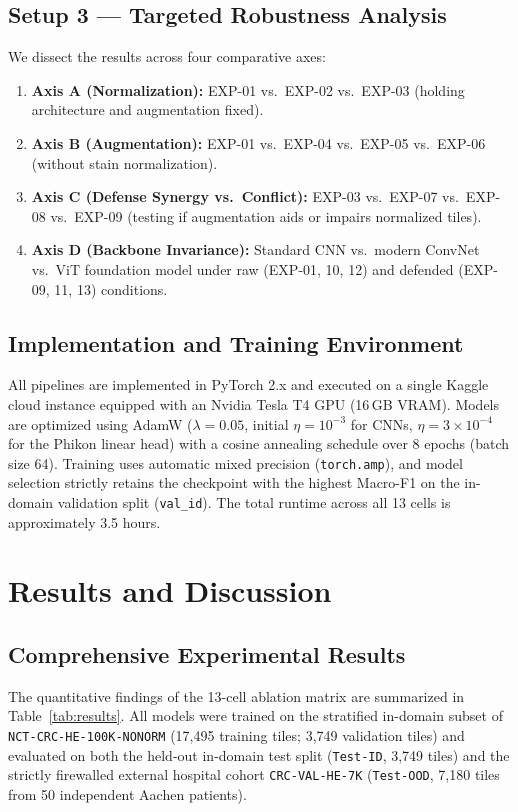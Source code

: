 \documentclass[11pt,a4paper]{article}
\begin{document}
\subsection{Setup 3 --- Targeted Robustness Analysis}
We dissect the results across four comparative axes:
\begin{enumerate}[leftmargin=*,itemsep=1pt]
  \item \textbf{Axis A (Normalization):} EXP-01 vs.\ EXP-02 vs.\ EXP-03 (holding architecture and augmentation fixed).
  \item \textbf{Axis B (Augmentation):} EXP-01 vs.\ EXP-04 vs.\ EXP-05 vs.\ EXP-06 (without stain normalization).
  \item \textbf{Axis C (Defense Synergy vs.\ Conflict):} EXP-03 vs.\ EXP-07 vs.\ EXP-08 vs.\ EXP-09 (testing if augmentation aids or impairs normalized tiles).
  \item \textbf{Axis D (Backbone Invariance):} Standard CNN vs.\ modern ConvNet vs.\ ViT foundation model under raw (EXP-01, 10, 12) and defended (EXP-09, 11, 13) conditions.
\end{enumerate}

\subsection{Implementation and Training Environment}
All pipelines are implemented in PyTorch 2.x and executed on a single Kaggle cloud instance equipped with an Nvidia Tesla T4 GPU (16\,GB VRAM). Models are optimized using AdamW ($\lambda = 0.05$, initial $\eta = 10^{-3}$ for CNNs, $\eta = 3\times 10^{-4}$ for the Phikon linear head) with a cosine annealing schedule over 8 epochs (batch size 64). Training uses automatic mixed precision (\texttt{torch.amp}), and model selection strictly retains the checkpoint with the highest Macro-F1 on the in-domain validation split (\texttt{val\_id}). The total runtime across all 13 cells is approximately 3.5 hours.

\section{Results and Discussion}

\subsection{Comprehensive Experimental Results}
The quantitative findings of the 13-cell ablation matrix are summarized in
Table~\ref{tab:results}. All models were trained on the stratified in-domain subset of
\texttt{NCT-CRC-HE-100K-NONORM} (17{,}495 training tiles; 3{,}749 validation tiles)
and evaluated on both the held-out in-domain test split (\texttt{Test-ID}, 3{,}749
tiles) and the strictly firewalled external hospital cohort \texttt{CRC-VAL-HE-7K}
(\texttt{Test-OOD}, 7{,}180 tiles from 50 independent Aachen patients).
\end{document}
